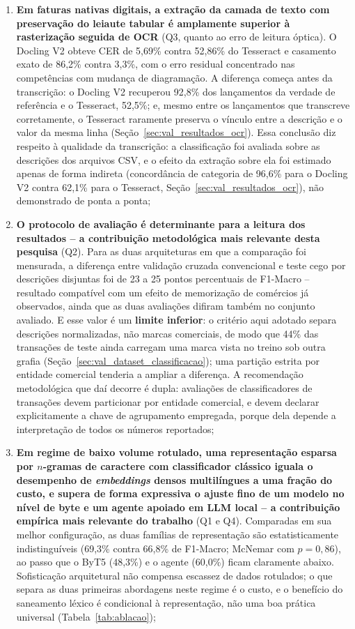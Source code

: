 \begin{enumerate}
	\item \textbf{Em faturas nativas digitais, a extração da camada de texto com preservação do leiaute tabular é amplamente superior à rasterização seguida de OCR} (Q3, quanto ao erro de leitura óptica). O Docling V2 obteve CER de 5,69\% contra 52,86\% do Tesseract e casamento exato de 86,2\% contra 3,3\%, com o erro residual concentrado nas competências com mudança de diagramação. A diferença começa antes da transcrição: o Docling V2 recuperou 92,8\% dos lançamentos da verdade de referência e o Tesseract, 52,5\%; e, mesmo entre os lançamentos que transcreve corretamente, o Tesseract raramente preserva o vínculo entre a descrição e o valor da mesma linha (Seção~\ref{sec:val_resultados_ocr}). Essa conclusão diz respeito à qualidade da transcrição: a classificação foi avaliada sobre as descrições dos arquivos CSV, e o efeito da extração sobre ela foi estimado apenas de forma indireta (concordância de categoria de 96,6\% para o Docling V2 contra 62,1\% para o Tesseract, Seção~\ref{sec:val_resultados_ocr}), não demonstrado de ponta a ponta;

	\item \textbf{O protocolo de avaliação é determinante para a leitura dos resultados -- a contribuição metodológica mais relevante desta pesquisa} (Q2). Para as duas arquiteturas em que a comparação foi mensurada, a diferença entre validação cruzada convencional e teste cego por descrições disjuntas foi de 23 a 25 pontos percentuais de F1-Macro -- resultado compatível com um efeito de memorização de comércios já observados, ainda que as duas avaliações difiram também no conjunto avaliado. E esse valor é um \textbf{limite inferior}: o critério aqui adotado separa descrições normalizadas, não marcas comerciais, de modo que 44\% das transações de teste ainda carregam uma marca vista no treino sob outra grafia (Seção~\ref{sec:val_dataset_classificacao}); uma partição estrita por entidade comercial tenderia a ampliar a diferença. A recomendação metodológica que daí decorre é dupla: avaliações de classificadores de transações devem particionar por entidade comercial, e devem declarar explicitamente a chave de agrupamento empregada, porque dela depende a interpretação de todos os números reportados;

	\item \textbf{Em regime de baixo volume rotulado, uma representação esparsa por $n$-gramas de caractere com classificador clássico iguala o desempenho de \textit{embeddings} densos multilíngues a uma fração do custo, e supera de forma expressiva o ajuste fino de um modelo no nível de byte e um agente apoiado em LLM local -- a contribuição empírica mais relevante do trabalho} (Q1 e Q4). Comparadas em sua melhor configuração, as duas famílias de representação são estatisticamente indistinguíveis (69,3\% contra 66,8\% de F1-Macro; McNemar com $p = 0{,}86$), ao passo que o ByT5 (48,3\%) e o agente (60,0\%) ficam claramente abaixo. Sofisticação arquitetural não compensa escassez de dados rotulados; o que separa as duas primeiras abordagens neste regime é o custo, e o benefício do saneamento léxico é condicional à representação, não uma boa prática universal (Tabela~\ref{tab:ablacao});


\end{enumerate}
